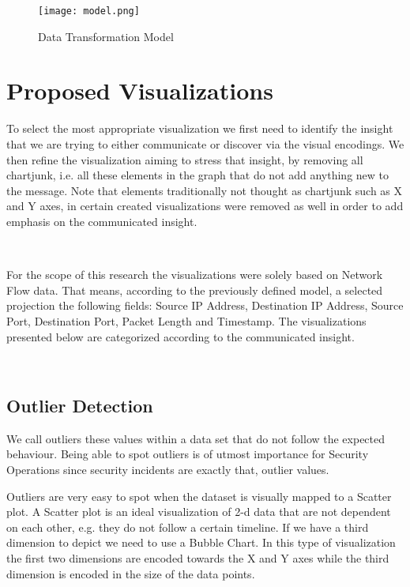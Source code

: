 \documentclass[16pt]{extreport}
\begin{document}
\begin{center}
	\begin{figure}[h]
		\texttt{[image: model.png]}
		\caption[]{Data Transformation Model}
	\end{figure}
\end{center}
\clearpage


\section{Proposed Visualizations}
\parbox{\linewidth}{
\justify
\large{
To select the most appropriate visualization we first need to identify the insight that we are trying to either communicate or discover via the visual encodings. We then refine the visualization aiming to stress that insight, by removing all chartjunk, i.e. all these elements in the graph that do not add anything new to the message. Note that elements traditionally not thought as chartjunk such as X and Y axes, in certain created visualizations were removed as well in order to add emphasis on the communicated insight.}} 
\hfill \break \\
\parbox{\linewidth}{
\justify
\large{
For the scope of this research the visualizations were solely based on Network Flow data. That means, according to the previously defined model, a selected projection the following fields: Source IP Address, Destination IP Address, Source Port, Destination Port, Packet Length and Timestamp. The visualizations presented below are categorized according to the communicated insight.}}
\hfill \break \\

\subsection{Outlier Detection}
\parbox{\linewidth}{
\justify
\large{
We call outliers these values within a data set that do not follow the expected behaviour. Being able to spot outliers is of utmost importance for Security Operations since security incidents are exactly that, outlier values. }}
\parbox{\linewidth}{
\justify
\large{Outliers are very easy to spot when the dataset is visually mapped to a Scatter plot. A Scatter plot is an ideal visualization of 2-d data that are not dependent on each other, e.g. they do not follow a certain timeline. If we have a third dimension to depict we need to use a Bubble Chart. In this type of visualization the first two dimensions are encoded towards the X and Y axes while the third dimension is encoded in the size of the data points.}}
\hfill \break \\
\end{document}
